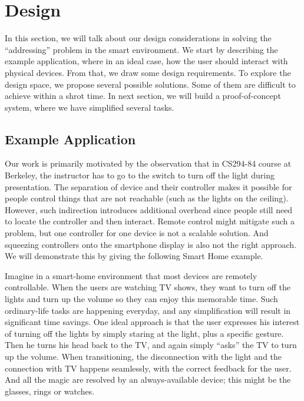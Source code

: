 \section{Design}
\label{sec:design}


In this section, we will talk about our design considerations in solving the ``addressing'' problem in the smart environment. We start by describing the example application, where in an ideal case, how the user should interact with physical devices. From that, we draw some design requirements. To explore the design space, we propose several possible solutions. Some of them are difficult to achieve within a shrot time. In next section, we will build a proof-of-concept system, where we have simplified several tasks.

\subsection{Example Application}
\label{sec:example-application}

Our work is primarily motivated by the observation that in CS294-84 course at Berkeley, the instructor has to go to the switch to turn off the light during presentation. The separation of device and their controller makes it possible for people control things that are not reachable (such as the lights on the ceiling). However, such indirection introduces additional overhead since people still need to locate the controller and then interact. Remote control might mitigate such a problem, but one controller for one device is not a scalable solution. And squeezing controllers onto the smartphone display is also not the right approach. We will demonstrate this by giving the following Smart Home example.

Imagine in a smart-home environment that most devices are remotely controllable. When the users are watching TV shows, they want to turn off the lights and turn up the volume so they can enjoy this memorable time. Such ordinary-life tasks are happening everyday, and any simplification will result in significant time savings. One ideal approach is that the user expresses his interest of turning off the lights by simply staring at the light, plus a specific gesture. Then he turns his head back to the TV, and again simply ``asks'' the TV to turn up the volume. When transitioning, the disconnection with the light and the connection with TV happens seamlessly, with the correct feedback for the user. And all the magic are resolved by an always-available device; this might be the glasses, rings or watches. 

